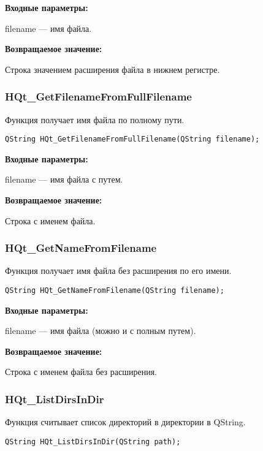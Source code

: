 \documentclass[a4paper,12pt]{article}
\begin{document}
\textbf{Входные параметры:}
 
filename --- имя файла.

\textbf{Возвращаемое значение:}

Строка значением расширения файла в нижнем регистре.


\subsubsection{HQt\_GetFilenameFromFullFilename}\label{HQt_GetFilenameFromFullFilename}

Функция получает имя файла по полному пути.


\begin{lstlisting}[label=code_syntax_HQt_GetFilenameFromFullFilename,caption=Синтаксис]
QString HQt_GetFilenameFromFullFilename(QString filename);
\end{lstlisting}

\textbf{Входные параметры:}
 
filename --- имя файла с путем.

\textbf{Возвращаемое значение:}

Строка с именем файла.


\subsubsection{HQt\_GetNameFromFilename}\label{HQt_GetNameFromFilename}

Функция получает имя файла без расширения по его имени.


\begin{lstlisting}[label=code_syntax_HQt_GetNameFromFilename,caption=Синтаксис]
QString HQt_GetNameFromFilename(QString filename);
\end{lstlisting}

\textbf{Входные параметры:}

filename --- имя файла (можно и с полным путем).

\textbf{Возвращаемое значение:}

Строка с именем файла без расширения.


\subsubsection{HQt\_ListDirsInDir}\label{HQt_ListDirsInDir}

Функция считывает список директорий в директории в QString.


\begin{lstlisting}[label=code_syntax_HQt_ListDirsInDir,caption=Синтаксис]
QString HQt_ListDirsInDir(QString path);
\end{lstlisting}
\end{document}
